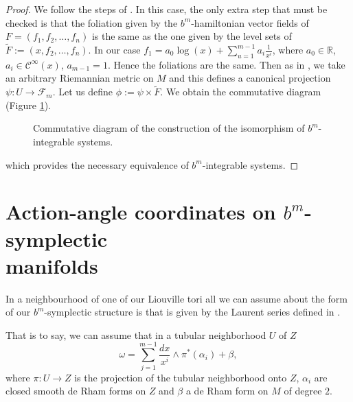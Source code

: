 \begin{proof}
We follow the steps of \cite{LMV11}. In this case, the only extra step that must be checked is that the foliation given by the $b^m$-hamiltonian vector fields of $F = (f_1,f_2, \ldots, f_n)$ is the same as the one given by the level sets of $\tilde F := (x, f_2,\ldots, f_n)$. In our case $f_1 = a_0\log(x) + \sum_{u=1}^{m-1} a_i\frac{1}{x^i}$, where $a_0 \in \mathbb{R}$, $a_i \in \mathcal{C}^\infty(x)$, $a_{m-1} = 1$. Hence the foliations are the same.
Then as in \cite{LMV11}, we take an arbitrary Riemannian metric on $M$ and this defines a canonical projection $\psi:U \rightarrow \mathcal{F}_m$. Let us define $\phi := \psi\times \tilde F$. We obtain the commutative diagram (Figure \ref{fig:diagram_topological}).

\begin{figure}[H]
\centering
{}
\caption{Commutative diagram of the construction of the isomorphism of $b^m$-integrable systems.}
\label{fig:diagram_topological}
\end{figure}

which provides the necessary equivalence of $b^m$-integrable systems.
\end{proof}


\section{Action-angle coordinates on $b^m$-symplectic \protect\\ manifolds}


In a neighbourhood of one of our Liouville tori all we can assume about the form of our $b^m$-symplectic structure is  that is given by the Laurent series defined in \cite{Scott16}.

That is to say, we can assume that in a tubular neighborhood $U$ of $Z$
$$\omega = \sum_{j=1}^{m-1}\frac{dx}{x^i}\wedge\pi^*(\alpha_i) + \beta,$$
where $\pi:U\rightarrow Z$ is the projection of the tubular neighborhood onto $Z$, $\alpha_i$ are closed smooth de Rham forms on $Z$ and $\beta$ a de Rham form on $M$ of degree $2$.

